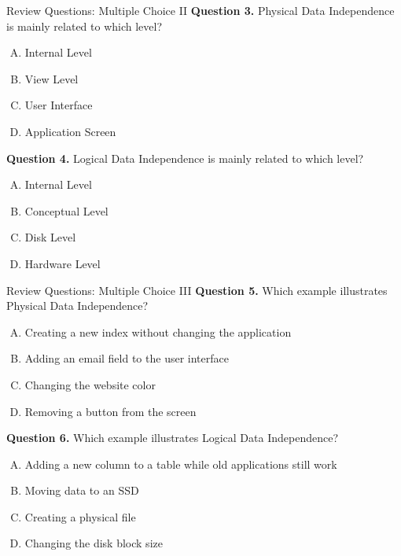 \documentclass[aspectratio=169,11pt]{beamer}
\begin{document}
\begin{frame}{Review Questions: Multiple Choice II}
\textbf{Question 3.} Physical Data Independence is mainly related to which level?
\begin{enumerate}[A.]
  \item Internal Level
  \item View Level
  \item User Interface
  \item Application Screen
\end{enumerate}

\vspace{0.2cm}
\textbf{Question 4.} Logical Data Independence is mainly related to which level?
\begin{enumerate}[A.]
  \item Internal Level
  \item Conceptual Level
  \item Disk Level
  \item Hardware Level
\end{enumerate}
\end{frame}

\begin{frame}{Review Questions: Multiple Choice III}
\textbf{Question 5.} Which example illustrates Physical Data Independence?
\begin{enumerate}[A.]
  \item Creating a new index without changing the application
  \item Adding an email field to the user interface
  \item Changing the website color
  \item Removing a button from the screen
\end{enumerate}

\vspace{0.2cm}
\textbf{Question 6.} Which example illustrates Logical Data Independence?
\begin{enumerate}[A.]
  \item Adding a new column to a table while old applications still work
  \item Moving data to an SSD
  \item Creating a physical file
  \item Changing the disk block size
\end{enumerate}
\end{frame}
\end{document}
